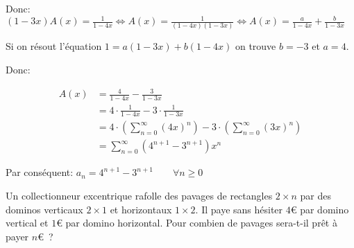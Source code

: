 Donc: $ (1-3x)A(x) = \frac{1}{1-4x} \Leftrightarrow A(x) = \frac{1}{(1-4x)(1-3x)} \Leftrightarrow A(x) = \frac{a}{1-4x} + \frac{b}{1-3x} $

Si on résout l'équation $1 = a(1-3x) + b(1-4x)$ on trouve $b = -3$ et $a = 4$. 

Donc: 

\begin{align*}
A(x) &= \frac{4}{1-4x} - \frac{3}{1-3x} \\
	&= 4 \cdot \frac{1}{1-4x} - 3 \cdot \frac{1}{1-3x}\\
	&= 4 \cdot ( \sum_{n=0}^{\infty} (4x)^n ) - 3 \cdot ( \sum_{n=0}^{\infty} (3x)^n ) \\
	&= \sum_{n=0}^{\infty} (4^{n+1} - 3^{n+1}) x^n
\end{align*}

Par conséquent: $a_n = 4^{n+1} - 3^{n+1} \qquad \forall n \geq 0$

\newpage

\begin{exo}
Un collectionneur excentrique rafolle des pavages de rectangles $2 \times n$ par des dominos verticaux $2 \times 1$ et horizontaux $1 \times 2$. Il paye sans h\'esiter $4$\euro{} par domino vertical et $1$\euro{} par domino horizontal. Pour combien de pavages sera-t-il pr\^et \`a payer $n$\euro~?
\end{exo}

